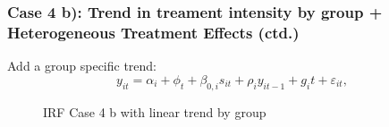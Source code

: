 \documentclass[notes,11pt, aspectratio = 169]{beamer}
\begin{document}
\begin{frame}\frametitle{Case 4 b): Trend in treament intensity by group + Heterogeneous Treatment Effects (ctd.)}
    \begin{wideitemize}
        \item Add a group specific trend:
         \[ y_{it} = \alpha_i + \phi_t + \beta_{0,i} s_{it} +\rho_i y_{it-1} + g_{i}t +\varepsilon_{it} , \]  
    \end{wideitemize}

    \begin{figure}
        \centering
      \caption{IRF Case 4 b with linear trend by group}
      \end{figure}
\end{frame}
\end{document}
